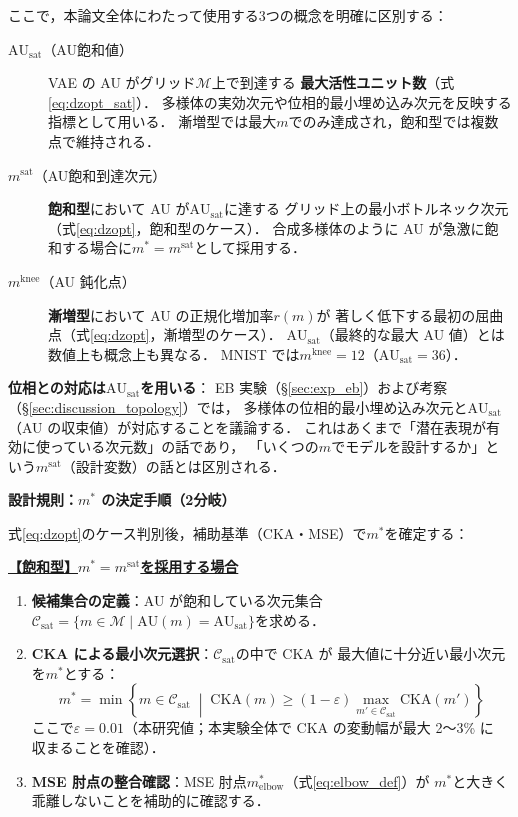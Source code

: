 \documentclass[12pt,a4paper]{jsarticle}
\newcommand{\dz}{m}                         %
\newcommand{\dzopt}{m^*}                    %
\newcommand{\AUsat}{\mathrm{AU}_{\mathrm{sat}}}
\newcommand{\dzsat}{m^{\mathrm{sat}}}       %
\newcommand{\mknee}{m^{\mathrm{knee}}}      %
\begin{document}
ここで，本論文全体にわたって使用する3つの概念を明確に区別する：
\begin{description}
  \item[$\AUsat$（AU飽和値）] VAE の AU がグリッド$\mathcal{M}$上で到達する
        \textbf{最大活性ユニット数}（式\eqref{eq:dzopt_sat}）．
        多様体の実効次元や位相的最小埋め込み次元を反映する指標として用いる．
        漸増型では最大$m$でのみ達成され，飽和型では複数点で維持される．
  \item[$\dzsat$（AU飽和到達次元）] \textbf{飽和型}において AU が$\AUsat$に達する
        グリッド上の最小ボトルネック次元（式\eqref{eq:dzopt}，飽和型のケース）．
        合成多様体のように AU が急激に飽和する場合に$\dzopt = \dzsat$として採用する．
  \item[$\mknee$（AU 鈍化点）] \textbf{漸増型}において AU の正規化増加率$r(m)$が
        著しく低下する最初の屈曲点（式\eqref{eq:dzopt}，漸増型のケース）．
        $\AUsat$（最終的な最大 AU 値）とは数値上も概念上も異なる．
        MNIST では$\mknee = 12$（$\AUsat = 36$）．
\end{description}

\textbf{位相との対応は$\AUsat$を用いる}：
EB 実験（§\ref{sec:exp_eb}）および考察（§\ref{sec:discussion_topology}）では，
多様体の位相的最小埋め込み次元と$\AUsat$（AU の収束値）が対応することを議論する．
これはあくまで「潜在表現が有効に使っている次元数」の話であり，
「いくつの$\dz$でモデルを設計するか」という$\dzsat$（設計変数）の話とは区別される．

\textbf{設計規則：$\dzopt$ の決定手順（2分岐）}

式\eqref{eq:dzopt}のケース判別後，補助基準（CKA・MSE）で$\dzopt$を確定する：

\medskip
\noindent\underline{\textbf{【飽和型】$\dzopt = \dzsat$を採用する場合}}
\begin{enumerate}
  \item \textbf{候補集合の定義}：AU が飽和している次元集合
        $\mathcal{C}_{\mathrm{sat}} = \{m \in \mathcal{M} \mid \mathrm{AU}(m) = \AUsat\}$を求める．
  \item \textbf{CKA による最小次元選択}：$\mathcal{C}_{\mathrm{sat}}$の中で CKA が
        最大値に十分近い最小次元を$\dzopt$とする：
        \begin{equation}
          \dzopt = \min\!\left\{m \in \mathcal{C}_{\mathrm{sat}}
          \;\middle|\;
          \mathrm{CKA}(m) \geq (1-\varepsilon)\max_{m'\in\mathcal{C}_{\mathrm{sat}}}\mathrm{CKA}(m')
          \right\}
          \label{eq:dzopt_cka}
        \end{equation}
        ここで$\varepsilon = 0.01$（本研究値；本実験全体で CKA の変動幅が最大 2〜3\% に
        収まることを確認）．
  \item \textbf{MSE 肘点の整合確認}：MSE 肘点$m^*_{\mathrm{elbow}}$（式\eqref{eq:elbow_def}）が
        $\dzopt$と大きく乖離しないことを補助的に確認する．
\end{enumerate}
\end{document}
